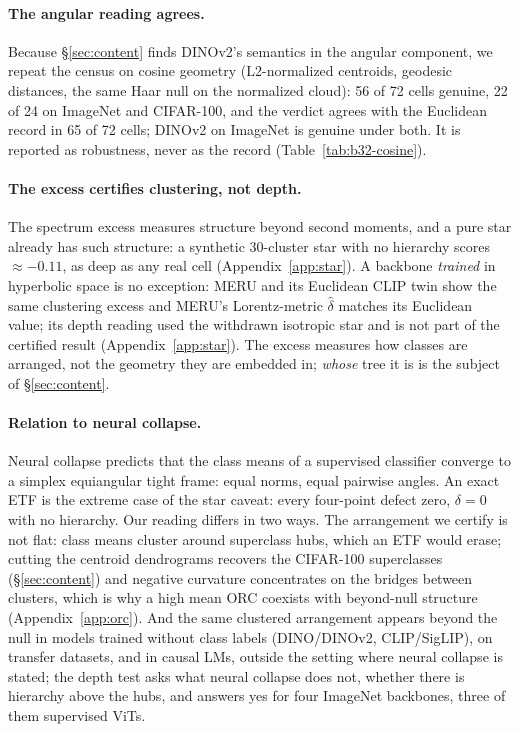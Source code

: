 \paragraph{The angular reading agrees.} Because \S\ref{sec:content} finds DINOv2's semantics in the angular component, we repeat the census on cosine geometry (L2-normalized centroids, geodesic distances, the same Haar null on the normalized cloud): 56 of 72 cells genuine, 22 of 24 on ImageNet and CIFAR-100, and the verdict agrees with the Euclidean record in 65 of 72 cells; DINOv2 on ImageNet is genuine under both. It is reported as robustness, never as the record (Table~\ref{tab:b32-cosine}). %

\paragraph{The excess certifies clustering, not depth.} The spectrum excess measures structure beyond second moments, and a pure star already has such structure: a synthetic 30-cluster star with no hierarchy scores $\approx-0.11$, as deep as any real cell (Appendix~\ref{app:star}). A backbone \emph{trained} in hyperbolic space is no exception: MERU \citep{desai2023meru} and its Euclidean CLIP twin show the same clustering excess and MERU's Lorentz-metric $\hat\delta$ matches its Euclidean value; its depth reading used the withdrawn isotropic star and is not part of the certified result (Appendix~\ref{app:star}). The excess measures how classes are arranged, not the geometry they are embedded in; \emph{whose} tree it is is the subject of \S\ref{sec:content}. %

\paragraph{Relation to neural collapse.} Neural collapse \citep{papyan2020prevalence} predicts that the class means of a supervised classifier converge to a simplex equiangular tight frame: equal norms, equal pairwise angles. An exact ETF is the extreme case of the star caveat: every four-point defect zero, $\delta=0$ with no hierarchy. Our reading differs in two ways. The arrangement we certify is not flat: class means cluster around superclass hubs, which an ETF would erase; cutting the centroid dendrograms recovers the CIFAR-100 superclasses (\S\ref{sec:content}) and negative curvature concentrates on the bridges between clusters, which is why a high mean ORC coexists with beyond-null structure (Appendix~\ref{app:orc}). And the same clustered arrangement appears beyond the null in models trained without class labels (DINO/DINOv2, CLIP/SigLIP), on transfer datasets, and in causal LMs, outside the setting where neural collapse is stated; the depth test asks what neural collapse does not, whether there is hierarchy above the hubs, and answers yes for four ImageNet backbones, three of them supervised ViTs. %

